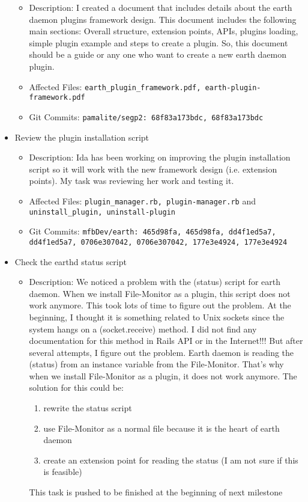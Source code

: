 \documentclass{article}
\begin{document}
\begin{itemize}
        \begin{itemize}
            \item Description: I created a document that includes details about the earth daemon plugins framework design. This document includes the following main sections: Overall structure, extension points, APIs, plugins loading, simple plugin example and steps to create a plugin. So, this document should be a guide or any one who want to create a new earth daemon plugin. 
            \item Affected Files: \texttt{earth\_plugin\_framework.pdf, earth-plugin-framework.pdf}
            \item Git Commits: \texttt{pamalite/segp2: 68f83a173bdc, 68f83a173bdc}
        \end{itemize}
    \item Review the plugin installation script 
        \begin{itemize}
            \item Description: Ida has been working on improving the plugin installation script so it will work with the new framework design (i.e. extension points). My task was reviewing her work and testing it. 
            \item Affected Files: \texttt{plugin\_manager.rb, plugin-manager.rb} and \texttt{uninstall\_plugin, uninstall-plugin}
            \item Git Commits: 
\texttt{mfbDev/earth: 465d98fa, 465d98fa, dd4f1ed5a7, dd4f1ed5a7, 0706e307042, 0706e307042, 177e3e4924, 177e3e4924} 
        \end{itemize}
    \item Check the earthd status script
        \begin{itemize}
            \item Description: We noticed a problem with the (status) script for earth daemon. When we install File-Monitor as a plugin, this script does not work anymore. This took lots of time to figure out the problem. At the beginning, I thought it is something related to Unix sockets since the system hangs on a (socket.receive) method. I did not find any documentation for this method in Rails API or in the Internet!!! But after several attempts, I figure out the problem. Earth daemon is reading the (status) from an instance variable from the File-Monitor. That's why when we install File-Monitor as a plugin, it does not work anymore. The solution for this could be: 
                \begin{enumerate}
                    \item rewrite the status script
                    \item use File-Monitor as a normal file because it is the heart of earth daemon
                    \item create an extension point for reading the status (I am not sure if this is feasible)
                \end{enumerate}
This task is pushed to be finished at the beginning of next milestone


\end{itemize}
\end{itemize}
\end{document}

